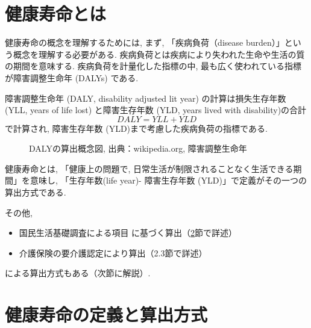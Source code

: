 \section{健康寿命とは}


健康寿命の概念を理解するためには, まず, 「疾病負荷（disease burden）」という概念を理解する必要がある. 疾病負荷とは疾病により失われた生命や生活の質の期間を意味する.
疾病負荷を計量化した指標の中,
最も広く使われている指標が障害調整生命年 (DALYs) である.

障害調整生命年 (DALY, disability adjusted lit year) の計算は損失生存年数 (YLL, years of life lost) と障害生存年数 (YLD, years lived with disability)の合計
	\begin{equation}
	\label{daly}
	DALY=YLL+YLD
	\end{equation}
	で計算され, 障害生存年数 (YLD)まで考慮した疾病負荷の指標である.



\begin{figure}[h!]
	\begin{center}
			\caption{DALYの算出概念図, 出典：wikipedia.org, 障害調整生命年
		}
	\end{center}
\end{figure}

健康寿命とは, 「健康上の問題で, 日常生活が制限されることなく生活できる期間」を意味し, 「生存年数(life year)- 障害生存年数 (YLD)」で定義がその一つの算出方式である.

その他,

\begin{itemize}
\item 国民生活基礎調査による項目  に基づく算出（\ref{survey}節で詳述）
\item 介護保険の要介護認定により算出（2.3節で詳述）
\end{itemize}
による算出方式もある（次節に解説）.



\section{健康寿命の定義と算出方式}
\label{survey}
%

